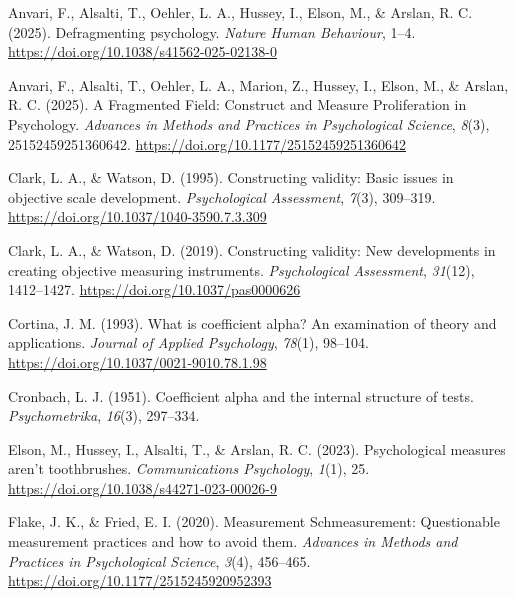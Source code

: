 \documentclass[
  nonatbib,
  authoryear,
  preprint]{elsarticle}
\newlength{\cslhangindent}
\newenvironment{CSLReferences}[2] %
 {\begin{list}{}{%
  \setlength{\itemindent}{0pt}
  \setlength{\leftmargin}{0pt}
  \setlength{\parsep}{0pt}
  \ifodd #1
   \setlength{\leftmargin}{\cslhangindent}
   \setlength{\itemindent}{-1\cslhangindent}
  \fi
  \setlength{\itemsep}{#2\baselineskip}}}
 {\end{list}}
\begin{document}
\label{refs}
\begin{CSLReferences}{1}{0}
Anvari, F., Alsalti, T., Oehler, L. A., Hussey, I., Elson, M., \&
Arslan, R. C. (2025). Defragmenting psychology. \emph{Nature Human
Behaviour}, 1--4. \url{https://doi.org/10.1038/s41562-025-02138-0}

Anvari, F., Alsalti, T., Oehler, L. A., Marion, Z., Hussey, I., Elson,
M., \& Arslan, R. C. (2025). A {Fragmented} {Field}: {Construct} and
{Measure} {Proliferation} in {Psychology}. \emph{Advances in Methods and
Practices in Psychological Science}, \emph{8}(3), 25152459251360642.
\url{https://doi.org/10.1177/25152459251360642}

Clark, L. A., \& Watson, D. (1995). Constructing validity: {Basic}
issues in objective scale development. \emph{Psychological Assessment},
\emph{7}(3), 309--319. \url{https://doi.org/10.1037/1040-3590.7.3.309}

Clark, L. A., \& Watson, D. (2019). Constructing validity: {New}
developments in creating objective measuring instruments.
\emph{Psychological Assessment}, \emph{31}(12), 1412--1427.
\url{https://doi.org/10.1037/pas0000626}

Cortina, J. M. (1993). What is coefficient alpha? {An} examination of
theory and applications. \emph{Journal of Applied Psychology},
\emph{78}(1), 98--104. \url{https://doi.org/10.1037/0021-9010.78.1.98}

Cronbach, L. J. (1951). Coefficient alpha and the internal structure of
tests. \emph{Psychometrika}, \emph{16}(3), 297--334.

Elson, M., Hussey, I., Alsalti, T., \& Arslan, R. C. (2023).
Psychological measures aren't toothbrushes. \emph{Communications
Psychology}, \emph{1}(1), 25.
\url{https://doi.org/10.1038/s44271-023-00026-9}

Flake, J. K., \& Fried, E. I. (2020). Measurement {Schmeasurement}:
{Questionable} measurement practices and how to avoid them.
\emph{Advances in Methods and Practices in Psychological Science},
\emph{3}(4), 456--465. \url{https://doi.org/10.1177/2515245920952393}


\end{CSLReferences}
\end{document}
